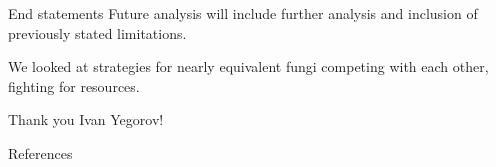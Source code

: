 \documentclass{beamer}
\begin{document}
\begin{frame}{End statements}
    Future analysis will include further analysis and inclusion of previously stated limitations.\newline
    
    We looked at strategies for nearly equivalent fungi competing with each other, fighting for resources. \newline
    
    Thank you Ivan Yegorov!
    
\end{frame}

\begin{frame}{References}
    
    
\end{frame}
\end{document}
